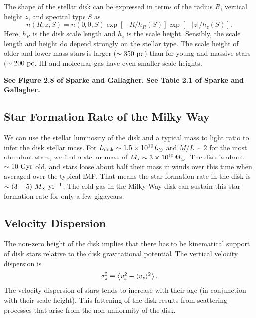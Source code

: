 \documentclass[]{article}
\begin{document}
The shape of the stellar disk can be expressed
in terms of the radius $R$, vertical height
$z$, and spectral type $S$ as
\begin{equation}
n(R,z,S) = n(0,0,S) \exp\left[-R/h_{R}(S)\right]\exp\left[-|z|/h_{z}(S)\right].
\end{equation}
\noindent
Here, $h_R$ is the disk scale length and $h_z$ is the scale height.
Sensibly, the scale length and height do depend strongly on the stellar
type.  The scale height of older and lower mass stars is larger 
($\sim350~\mathrm{pc}$) than for 
young and massive stars ($\sim200~\mathrm{pc}$. HI and molecular gas have even 
smaller scale heights.

{\bf See Figure 2.8 of Sparke and Gallagher.}
{\bf See Table 2.1 of Sparke and Gallagher.}

\subsection{Star Formation Rate of the Milky Way}

We can use the stellar luminosity of the disk and
a typical mass to light ratio to infer the disk stellar
mass. For $L_{\mathrm{disk}}\sim 1.5\times10^{10}L_{\odot}$
and $M/L\sim2$ for the most abundant stars, we find
a stellar mass of $M_{\star}\sim3 \times 10^{10}M_{\odot}$.
The disk is about $\sim10~\mathrm{Gyr}$ old, and stars loose
about half their mass in winds over this time when
averaged over the typical IMF. That means the star
formation rate in the disk is $\sim(3-5)~M_{\odot}~\mathrm{yr}^{-1}$.
The cold gas in the Milky Way disk can sustain this
star formation rate for only a few gigayears.

\subsection{Velocity Dispersion}

The non-zero height of the disk implies that there
has to be kinematical support of disk stars relative to
the disk gravitational potential. The vertical velocity
dispersion is
\begin{equation}
\sigma_z^2 \equiv \left\langle v_z^2 - \langle v_z\rangle^2\right\rangle.
\end{equation}
The velocity dispersion of stars tends to increase with their
age (in conjunction with their scale height). This fattening
of the disk results from scattering processes that arise from
the non-uniformity of the disk.
\end{document}
